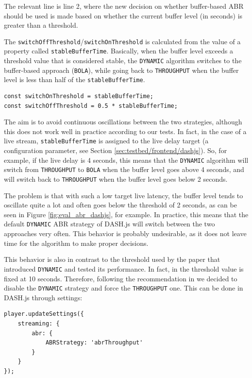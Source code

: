 The relevant line is line 2, where the new decision on whether buffer-based ABR should be used is made based on whether the current buffer level (in seconds) is greater than a threshold.

The \texttt{switchOffThreshold}/\texttt{switchOnThreshold} is calculated from the value of a property called \texttt{stableBufferTime}. Basically, when the buffer level exceeds a threshold value that is considered stable, the \texttt{DYNAMIC} algorithm switches to the buffer-based approach (\texttt{BOLA}), while going back to \texttt{THROUGHPUT} when the buffer level is less than half of the \texttt{stableBufferTime}.

\begin{verbatim}
const switchOnThreshold = stableBufferTime;
const switchOffThreshold = 0.5 * stableBufferTime;
\end{verbatim}

The aim is to avoid continuous oscillations between the two strategies, although this does not work well in practice according to our tests. In fact, in the case of a live stream, \texttt{stableBufferTime} is assigned to the live delay target (a configuration parameter, see Section \ref{sec:testbed/frontend/dashjs}). So, for example, if the live delay is 4 seconds, this means that the \texttt{DYNAMIC} algorithm will switch from \texttt{THROUGHPUT} to \texttt{BOLA} when the buffer level goes above 4 seconds, and will switch back to \texttt{THROUGHPUT} when the buffer level goes below 2 seconds.

The problem is that with such a low target live latency, the buffer level tends to oscillate quite a lot and often goes below the threshold of 2 seconds, as can be seen in Figure \ref{fig:eval_abr_dashjs}, for example. In practice, this means that the default \texttt{DYNAMIC} ABR strategy of DASH.js will switch between the two approaches very often. This behavior is probably undesirable, as it does not leave time for the algorithm to make proper decisions.

This behavior is also in contrast to the threshold used by the paper that introduced \texttt{DYNAMIC} and tested its performance. In fact, in \cite{dashjs_dynamic} the threshold value is fixed at 10 seconds. Therefore, following the recommendation in \cite{dashjs_dynamic} we decided to disable the \texttt{DYNAMIC} strategy and force the \texttt{THROUGHPUT} one. This can be done in DASH.js through settings:

\begin{verbatim}
player.updateSettings({
    streaming: {
        abr: {
            ABRStrategy: 'abrThroughput'
        }
    }
});
\end{verbatim}

